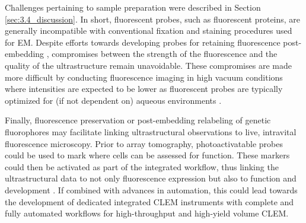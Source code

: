 Challenges pertaining to sample preparation were described in Section \ref{sec:3.4_discussion}. In short, fluorescent probes, such as fluorescent proteins, are generally incompatible with conventional fixation and staining procedures used for EM. Despite efforts towards developing probes for retaining fluorescence post-embedding \cite{watanabe2011protein, kukulski2011correlated, peddie2014correlative}, compromises between the strength of the fluorescence and the quality of the ultrastructure remain unavoidable. These compromises are made more difficult by conducting fluorescence imaging in high vacuum conditions where intensities are expected to be lower as fluorescent probes are typically optimized for (if not dependent on) aqueous environments \cite{peddie2014correlative}.

Finally, fluorescence preservation or post-embedding relabeling of genetic fluorophores may facilitate linking ultrastructural observations to live, intravital fluorescence microscopy. Prior to array tomography, photoactivatable probes could be used to mark where cells can be assessed for function. These markers could then be activated as part of the integrated workflow, thus linking the ultrastructural data to not only fluorescence expression but also to function and development \cite{collinson2017correlating}. If combined with advances in automation, this could lead towards the development of dedicated integrated CLEM instruments with complete and fully automated workflows for high-throughput and high-yield volume CLEM.
